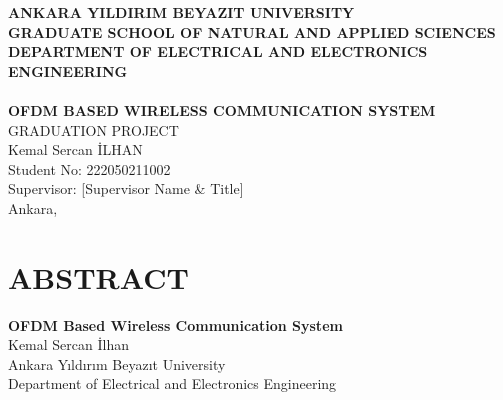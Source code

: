 \documentclass[12pt, a4paper, oneside]{report}
\begin{document}

\begin{titlepage}
  \begin{center}
    \vspace*{0.5cm}
    {\Large\bfseries ANKARA YILDIRIM BEYAZIT UNIVERSITY}\\[0.4cm]
    {\large\bfseries GRADUATE SCHOOL OF NATURAL AND APPLIED SCIENCES}\\[0.2cm]
    {\large\bfseries DEPARTMENT OF ELECTRICAL AND ELECTRONICS ENGINEERING}\\[2.0cm]

    \\[2.0cm]

    {\LARGE\bfseries OFDM BASED WIRELESS COMMUNICATION SYSTEM}\\[1.5cm]

    {\large GRADUATION PROJECT}\\[2.0cm]

    {\large Kemal Sercan \textsc{İLHAN}}\\[0.2cm]
    {\normalsize Student No: 222050211002}\\[2.0cm]

    {\normalsize Supervisor: [Supervisor Name \& Title]}\\[2.5cm]

    {\normalsize Ankara, \the\year}
  \end{center}
\end{titlepage}

\chapter*{ABSTRACT}
\thispagestyle{plain}

\begin{center}
  {\large\bfseries OFDM Based Wireless Communication System}\\[0.5cm]
  Kemal Sercan İlhan\\
  Ankara Yıldırım Beyazıt University\\
  Department of Electrical and Electronics Engineering
\end{center}
\end{document}
